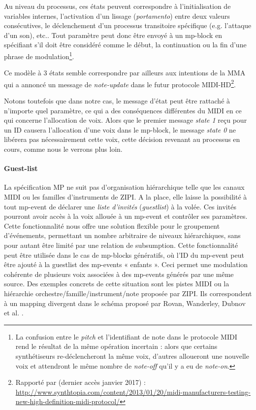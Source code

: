 Au niveau du processus, ces états peuvent correspondre à l'initialisation de variables internes, l'activation d'un lissage (\textit{portamento}) entre deux valeurs consécutives, le déclenchement d'un processus transitoire spécifique (e.g. l'attaque d'un son), etc.. Tout paramètre peut donc être envoyé à un mp-block en spécifiant s'il doit être considéré comme le début, la continuation ou la fin d'une phrase de modulation\footnote{ La confusion entre le \textit{pitch} et l'identifiant de note dans le protocole MIDI rend le résultat de la même opération incertain : alors que certains synthétiseurs re-déclencheront la même voix, d'autres alloueront une nouvelle voix et attendront le même nombre de \textit{note-off} qu'il y a eu de \textit{note-on}.}.

Ce modèle à 3 états semble correspondre par ailleurs aux intentions de la MMA qui a annoncé un message de \textit{note-update} dans le futur protocole MIDI-HD\footnote{ Rapporté par (dernier accès janvier 2017) : \url{http://www.synthtopia.com/content/2013/01/20/midi-manufacturers-testing-new-high-definition-midi-protocol/}}.

Notons toutefois que dans notre cas, le message d'état peut être rattaché à n'importe quel paramètre, ce qui a des conséquences différentes du MIDI en ce qui concerne l'allocation de voix. Alors que le premier message \textit{state 1} reçu pour un ID causera l'allocation d'une voix dans le mp-block, le message \textit{state 0} ne libérera pas nécessairement cette voix, cette décision revenant au processus en cours, comme nous le verrons plus loin.

\paragraph{Guest-list}
La spécification MP ne suit pas d'organisation hiérarchique telle que les canaux MIDI ou les familles d'instruments de ZIPI. A la place, elle laisse la possibilité à tout mp-event de déclarer une \textit{liste d'invités} (\textit{guestlist}) à la volée. Ces invités pourront avoir accès à la voix allouée à un mp-event et contrôler ses paramètres. Cette fonctionnalité nous offre une solution flexible pour le groupement d'événements, permettant un nombre arbitraire de niveaux hiérarchiques, sans pour autant être limité par une relation de subsumption.
Cette fonctionnalité peut être utilisée dans le cas de mp-blocks génératifs, où l'ID du mp-event peut être ajouté à la guestlist des mp-events « enfants ». Ceci permet une modulation cohérente de plusieurs voix associées à des mp-events générés par une même source. Des exemples concrets de cette situation sont les pistes MIDI ou la hiérarchie orchestre/famille/instrument/note proposée par ZIPI. Ils correspondent à un mapping divergent dans le schéma proposé par Rovan, Wanderley, Dubnov et al. \cite{rovan_instrumental_1997}.

